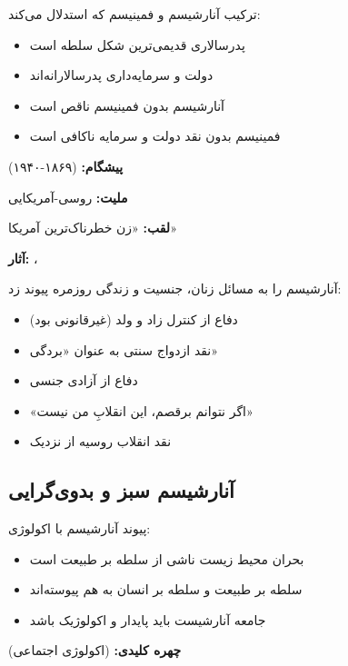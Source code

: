 \begin{defbox}
ترکیب آنارشیسم و فمینیسم که استدلال می‌کند:
\begin{itemize}[nosep]
    \item پدرسالاری قدیمی‌ترین شکل سلطه است
    \item دولت و سرمایه‌داری پدرسالارانه‌اند
    \item آنارشیسم بدون فمینیسم ناقص است
    \item فمینیسم بدون نقد دولت و سرمایه ناکافی است
\end{itemize}
\textbf{پیشگام:}  (۱۸۶۹-۱۹۴۰)
\end{defbox}

\begin{personbox}

\textbf{ملیت:} روسی-آمریکایی

\textbf{لقب:} «زن خطرناک‌ترین آمریکا»

\textbf{آثار:} ، 

\mediumspace

 آنارشیسم را به مسائل زنان، جنسیت و زندگی روزمره پیوند زد:

\begin{itemize}[nosep]
    \item دفاع از کنترل زاد و ولد (غیرقانونی بود)
    \item نقد ازدواج سنتی به عنوان «بردگی»
    \item دفاع از آزادی جنسی
    \item «اگر نتوانم برقصم، این انقلابِ من نیست»
    \item نقد انقلاب روسیه از نزدیک
\end{itemize}
\end{personbox}

\subsection{آنارشیسم سبز و بدوی‌گرایی}

\begin{defbox}
پیوند آنارشیسم با اکولوژی:
\begin{itemize}[nosep]
    \item بحران محیط زیست ناشی از سلطه بر طبیعت است
    \item سلطه بر طبیعت و سلطه بر انسان به هم پیوسته‌اند
    \item جامعه آنارشیست باید پایدار و اکولوژیک باشد
\end{itemize}
\textbf{چهره کلیدی:}  (اکولوژی اجتماعی)
\end{defbox}

